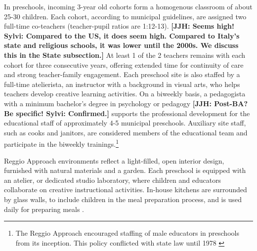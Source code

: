 In preschools, incoming 3-year old cohorts form a homogenous classroom of about 25-30 children. Each cohort, according to municipal guidelines, are assigned two full-time co-teachers (teacher-pupil ratios are 1:12-13). \textbf{[JJH: Seems high! Sylvi: Compared to the US, it does seem high. Compared to Italy's state and religious schools, it was lower until the 2000s. We discuss this in the State subsection.]} At least 1 of the 2 teachers remains with each cohort for three consecutive years, offering extended time for continuity of care and strong teacher-family engagement. Each preschool site is also staffed by a full-time atelierista, an instructor with a background in visual arts, who helps teachers develop creative learning activities. On a biweekly basis, a pedagogista with a minimum bachelor's degree in psychology or pedagogy \textbf{[JJH: Post-BA? Be specific! Sylvi: Confirmed.]} supports the professional development for the educational staff of approximately 4-5 municipal preschools. Auxiliary site staff, such as cooks and janitors, are considered members of the educational team and participate in the biweekly trainings.\footnote{The Reggio Approach encouraged staffing of male educators in preschools from its inception. This policy conflicted with state law until 1978 \citep{Hohnerlein_2015_Development-and-Diffusion.}}

Reggio Approach environments reflect a light-filled, open interior design, furnished with natural materials and a garden. Each preschool is equipped with an atelier, or dedicated studio laboratory, where children and educators collaborate on creative instructional activities. In-house kitchens are surrounded by glass walls, to include children in the meal preparation process, and is used daily for preparing meals \citep{Rinaldi_2006_ReggioEmilia_BOOK,Vecchi_2010_ReggioEmilia_BOOK}. 

